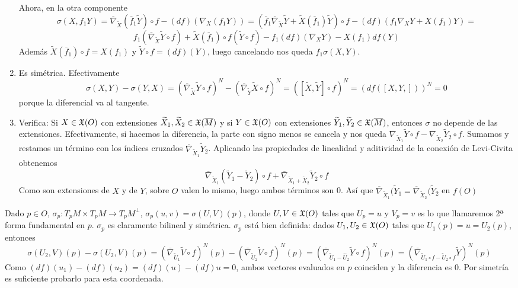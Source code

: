 \documentclass[GSR.tex]{subfiles}
\begin{document}
\begin{defi}
\begin{enumerate}
Ahora, en la otra componente
$$
\sigma(X,f_1Y)=\overline{\nabla}_{\widetilde{X}}(\overline{f}_1\widetilde{Y})\circ f-(df)(\nabla_X(f_1Y))=(\overline{f}_1\overline{\nabla}_{\widetilde{X}}\widetilde{Y} +\widetilde{X}(\overline{f}_1)\widetilde{Y})\circ f-(df)(f_1\nabla_XY+X(f_1)Y)=
$$
$$
f_1(\overline{\nabla}_{\widetilde{X}}\widetilde{Y}\circ f)+\widetilde{X}(\overline{f}_1)\circ f(\widetilde{Y}\circ f)-f_1(df)(\nabla_XY)-X(f_1)df(Y)
$$
Además $\widetilde{X}(\overline{f}_1)\circ f=X(f_1)$ y $\widetilde{Y}\circ f=(df)(Y)$, luego cancelando nos queda $f_1\sigma(X,Y)$. 
\item Es simétrica. Efectivamente
$$\sigma(X,Y)-\sigma(Y,X)=(\overline{\nabla}_{\widetilde{X}}\widetilde{Y}\circ f)^N-(\overline{\nabla}_{\widetilde{Y}}\widetilde{X}\circ f)^N=([\widetilde{X},\widetilde{Y}]\circ f)^N=(df([X,Y,]))^N=0$$
porque la diferencial va al tangente. 
\item Verifica: Si $X\in{\mathfrak{X}}(O)$ con extensiones $\widetilde{X}_1,\widetilde{X}_2\in{\mathfrak{X}}(\overline{M})$ y si $Y\in{\mathfrak{X}}(O)$ con extensiones $\widetilde{Y}_1,\widetilde{Y}_2\in{\mathfrak{X}}(\overline{M})$, entonces $\sigma$ no depende de las extensiones. Efectivamente, si hacemos la diferencia, la parte con signo menos se cancela y nos queda $\overline{\nabla}_{\widetilde{X}_1}\widetilde{Y}\circ f-\overline{\nabla}_{\widetilde{X}_2}\widetilde{Y}_2\circ f$. Sumamos y restamos un término con los índices cruzados $\overline{\nabla}_{\widetilde{X}_1}\widetilde{Y}_2$. Aplicando las propiedades de linealidad y aditividad de la conexión de Levi-Civita obtenemos
$$\overline{\nabla}_{\widetilde{X}_1}(\widetilde{Y}_1-\widetilde{Y}_2)\circ f+\overline{\nabla}_{\widetilde{X}_1+\widetilde{X}_2}\widetilde{Y}_2\circ f$$
Como son extensiones de $X$ y de $Y$, sobre $O$ valen lo mismo, luego ambos términos son 0. Así que $\overline{\nabla}_{\widetilde{X}_1}(\widetilde{Y}_1=\overline{\nabla}_{\widetilde{X}_2}(\widetilde{Y}_2$ en $f(O)$
\end{enumerate}
\end{defi}

Dado $p\in O$, $\sigma_p:T_pM\times T_pM\to T_pM^\perp$, $\sigma_p(u,v)=\sigma(U,V)(p)$, donde $U,V\in{\mathfrak{X}}(O)$ tales que $U_p=u$ y $V_p=v$ es lo que llamaremos 2ª forma fundamental en $p$. $\sigma_p$ es claramente bilineal y simétrica. $\sigma_p$ está bien definida: dados $U_1,U_2\in{\mathfrak{X}}(O)$ tales que $U_1(p)=u=U_2(p)$, entonces 
\[
\sigma(U_2,V)(p)-\sigma(U_2, V)(p)=(\overline{\nabla}_{\widetilde{U}_1}\widetilde{V}\circ f)^N(p)-(\overline{\nabla}_{\widetilde{U}_2}\widetilde{V}\circ f)^N(p)=(\overline{\nabla}_{\widetilde{U}_1-\widehat{U}_2}\widetilde{Y}\circ f)^N(p)=(\overline{\nabla}_{\widetilde{U}_1\circ f-\widetilde{U}_2\circ f}\widetilde{Y})^N(p)
\]
Como $(df)(u_1)-(df)(u_2)=(df)(u)-(df)u=0$, ambos vectores evaluados en $p$ coinciden y la diferencia es 0. Por simetría es suficiente probarlo para esta coordenada. 
\end{document}
